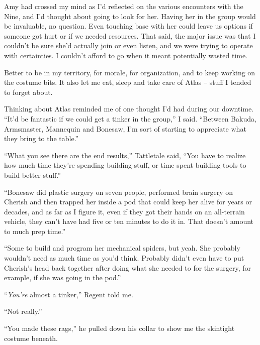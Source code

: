 Amy had crossed my mind as I'd reflected on the various encounters with the Nine, and I'd thought about going to look for her.  Having her in the group would be invaluable, no question.  Even touching base with her could leave us options if someone got hurt or if we needed resources.  That said, the major issue was that I couldn't be sure she'd actually join or even listen, and we were trying to operate with certainties.  I couldn't afford to go when it meant potentially wasted time.



Better to be in my territory, for morale, for organization, and to keep working on the costume bits.  It also let me eat, sleep and take care of Atlas – stuff I tended to forget about.



Thinking about Atlas reminded me of one thought I'd had during our downtime.  ``It'd be fantastic if we could get a tinker in the group,'' I said.  ``Between Bakuda, Armsmaster, Mannequin and Bonesaw, I'm sort of starting to appreciate what they bring to the table.''



``What you see there are the end results,'' Tattletale said, ``You have to realize how much time they're spending building stuff, or time spent building tools to build better stuff.''



``Bonesaw did plastic surgery on seven people, performed brain surgery on Cherish and then trapped her inside a pod that could keep her alive for years or decades, and as far as I figure it, even if they got their hands on an all-terrain vehicle, they can't have had five or ten minutes to do it in.  That doesn't amount to much prep time.''



``Some to build and program her mechanical spiders, but yeah.  She probably wouldn't need as much time as you'd think.  Probably didn't even have to put Cherish's head back together after doing what she needed to for the surgery, for example, if she was going in the pod.''



``\emph{You're} almost a tinker,'' Regent told me.



``Not really.''



``You made these rags,'' he pulled down his collar to show me the skintight costume beneath.



